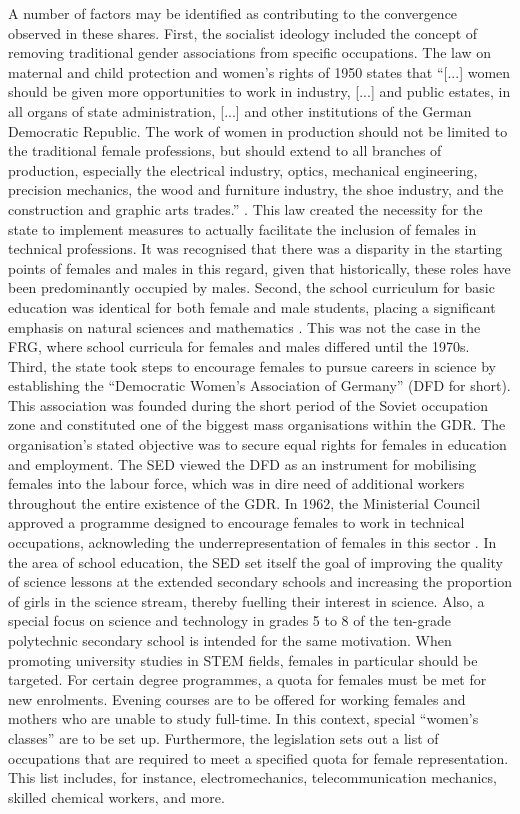\documentclass[a4paper, oneside, hyperfootnotes = false]{article}
\begin{document}
{%
A number of factors may be identified as contributing to the convergence observed in these shares.
First, the socialist ideology included the concept of removing traditional gender associations from specific occupations.
The law on maternal and child protection and women's rights of 1950 states that ``[...] women should be given more opportunities to work in industry, [...] and public estates, in all organs of state administration, [...] and other institutions of the German Democratic Republic.
The work of women in production should not be limited to the traditional female professions, but should extend to all branches of production, especially the electrical industry, optics, mechanical engineering, precision mechanics, the wood and furniture industry, the shoe industry, and the construction and graphic arts trades.'' \citep[§19.1]{GBl1950}.
This law created the necessity for the state to implement measures to actually facilitate the inclusion of females in technical professions.
It was recognised that there was a disparity in the starting points of females and males in this regard, given that historically, these roles have been predominantly occupied by males.
Second, the school curriculum for basic education was identical for both female and male students, placing a significant emphasis on natural sciences and mathematics \citep{FuchsSchuendeln2016, Campa2019, Davoli2021}.
This was not the case in the FRG, where school curricula for females and males differed until the 1970s.
Third, the state took steps to encourage females to pursue careers in science by establishing the ``Democratic Women's Association of Germany'' (DFD for short).
This association was founded during the short period of the Soviet occupation zone and constituted one of the biggest mass organisations within the GDR.
The organisation's stated objective was to secure equal rights for females in education and employment.
The SED viewed the DFD as an instrument for mobilising females into the labour force, which was in dire need of additional workers throughout the entire existence of the GDR.
In 1962, the Ministerial Council approved a programme designed to encourage females to work in technical occupations, acknowleding the underrepresentation of females in this sector \citep{GBl1962}.
In the area of school education, the SED set itself the goal of improving the quality of science lessons at the extended secondary schools and increasing the proportion of girls in the science stream, thereby fuelling their interest in science.
Also, a special focus on science and technology in grades 5 to 8 of the ten-grade polytechnic secondary school is intended for the same motivation.
When promoting university studies in STEM fields, females in particular should be targeted.
For certain degree programmes, a quota for females must be met for new enrolments.
Evening courses are to be offered for working females and mothers who are unable to study full-time.
In this context, special ``women's classes'' are to be set up.
Furthermore, the legislation sets out a list of occupations that are required to meet a specified quota for female representation.
This list includes, for instance, electromechanics, telecommunication mechanics, skilled chemical workers, and more.

}
\end{document}
